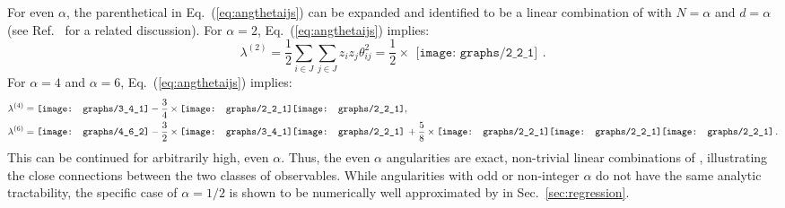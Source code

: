 \documentclass[letterpaper,11pt]{article}
\DeclareRobustCommand{\Sec}[1]{Sec.~\ref{#1}}
\DeclareRobustCommand{\Eq}[1]{Eq.~(\ref{#1})}
\DeclareRobustCommand{\Ref}[1]{Ref.~\cite{#1}}
\newcommand{\Bs}{\text{EFPs}\xspace}
\begin{document}
For even $\alpha$, the parenthetical in \Eq{eq:angthetaijs} can be expanded and identified to be a linear combination of \Bs with $N = \alpha$ and $d=\alpha$ (see \Ref{GurAri:2011vx} for a related discussion).
%
For $\alpha = 2$, \Eq{eq:angthetaijs} implies:
\begin{equation}\label{eq:lam2}
\lambda^{(2)} = \frac12\sum_{i\in J} \sum_{j\in J} z_{i}z_{j} \theta_{ij}^2 =\frac12\times \begin{gathered}
\texttt{[image: graphs/2\_2\_1]}
\end{gathered}.
\end{equation}
For $\alpha = 4$ and $\alpha = 6$,  \Eq{eq:angthetaijs} implies:
\begin{align}\label{eq:lam4}
\lambda^{(4)} &=
\begin{gathered}
\texttt{[image: graphs/3\_4\_1]}
\end{gathered}
-\frac34 \times
\begin{gathered}
\texttt{[image: graphs/2\_2\_1]}\hspace{0mm}
\texttt{[image: graphs/2\_2\_1]}
\end{gathered}, 
\\
\label{eq:lam6}
\lambda^{(6)}&=
\begin{gathered}
\texttt{[image: graphs/4\_6\_2]}
\end{gathered}
-\frac32 \times
\begin{gathered}
\texttt{[image: graphs/3\_4\_1]}
\end{gathered}
\hspace{0mm}
\begin{gathered}
\texttt{[image: graphs/2\_2\_1]}
\end{gathered}\,
+\frac58\times
\begin{gathered}
\texttt{[image: graphs/2\_2\_1]}\hspace{0mm}
\texttt{[image: graphs/2\_2\_1]}\hspace{0mm}
\texttt{[image: graphs/2\_2\_1]}
\end{gathered}\,.
\end{align}
%
This can be continued for arbitrarily high, even $\alpha$.
%
Thus, the even $\alpha$ angularities are exact, non-trivial linear combinations of \Bs, illustrating the close connections between the two classes of observables.
%
While angularities with odd or non-integer $\alpha$ do not have the same analytic tractability, the specific case of $\alpha=1/2$ is shown to be numerically well approximated by \Bs in \Sec{sec:regression}.
\end{document}
